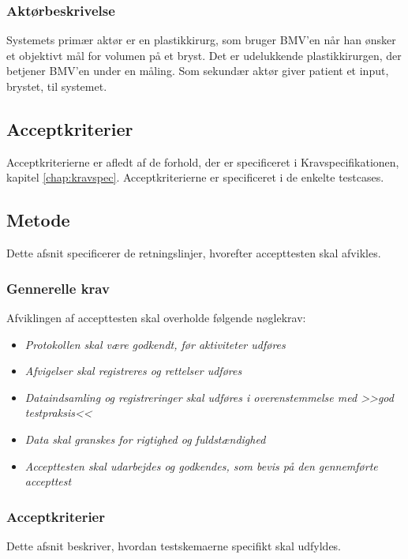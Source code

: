 		\subsubsection{Aktørbeskrivelse}
		Systemets primær aktør er en plastikkirurg, som bruger BMV'en når han ønsker et objektivt mål for volumen på et bryst. Det er udelukkende plastikkirurgen, der  betjener BMV'en under en måling. Som sekundær aktør giver patient et input, brystet, til systemet.
		
		\subsection{Acceptkriterier}
		Acceptkriterierne er afledt af de forhold, der er specificeret i Kravspecifikationen, kapitel \ref{chap:kravspec}. Acceptkriterierne er specificeret i de enkelte testcases. 
		
		\subsection{Metode}
		Dette afsnit specificerer de retningslinjer, hvorefter accepttesten skal afvikles. 
		
			\subsubsection{Gennerelle krav}
			Afviklingen af accepttesten skal overholde følgende nøglekrav: 
			
			\begin{itemize}
				\item \textit{Protokollen skal være godkendt, før aktiviteter udføres}
				\item \textit{Afvigelser skal registreres og rettelser udføres}
				\item \textit{Dataindsamling og registreringer skal udføres i overenstemmelse med >>god testpraksis<< }
				\item \textit{Data skal granskes for rigtighed og fuldstændighed }
				\item \textit{Accepttesten skal udarbejdes og godkendes, som bevis på den gennemførte accepttest}
			\end{itemize}
			
			\subsubsection{Acceptkriterier}
			 Dette afsnit beskriver, hvordan testskemaerne specifikt skal udfyldes. 
			 
